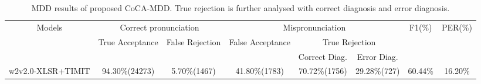 \documentclass[a4paper]{article}
\begin{document}
\begin{table}[!t]
\centering
\caption{MDD results of proposed CoCA-MDD. True rejection is further analysed with correct diagnosis and error diagnosis.  
}
\setlength{\tabcolsep}{3pt}
\begin{adjustbox}{width=1\textwidth}
\begin{tabular}{c|c|c|c|c|c|c|c}
\hline
\multirow{3}{*}{Models} & \multicolumn{2}{c|}{Correct pronunciation}                                 & \multicolumn{3}{c|}{Mispronunciation}                                 & \multirow{3}{*}{F1(\%)} & \multirow{3}{*}{PER(\%)} \\ \cline{2-6}
                        & \multirow{2}{*}{True Acceptance} & \multirow{2}{*}{False Rejection} & \multirow{2}{*}{False Acceptance} & \multicolumn{2}{c|}{True Rejection}   &                         &                          \\ \cline{5-6}
                        &                              &                                  &                               & Correct Diag.          & Error Diag.  &                         &                          \\ \hline
w2v2.0-XLSR+TIMIT \cite{peng2021study}       & 94.30\%(24273)               & 5.70\%(1467)                     & 41.80\%(1783)                 & 70.72\%(1756)          & 29.28\%(727) & 60.44\%                 & 16.20\%                  \\ \hline

\end{tabular}
\end{adjustbox}
\end{table}
\end{document}
